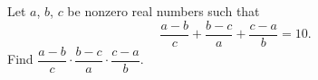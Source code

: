 Let $a$, $b$, $c$ be nonzero real numbers such that
\[\dfrac{a-b}{c}+\dfrac{b-c}{a}+\dfrac{c-a}{b}=10.\]
Find $\dfrac{a-b}{c}\cdot\dfrac{b-c}{a}\cdot\dfrac{c-a}{b}$.
